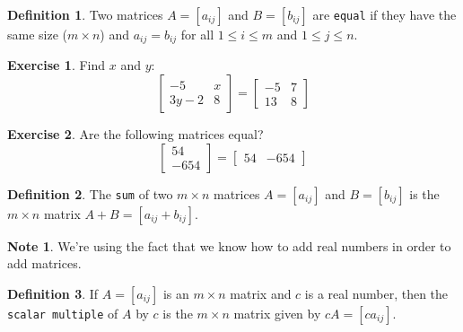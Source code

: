 \documentclass[handout]{beamer}
\newcommand{\fn}{\insertframenumber}
\theoremstyle{definition}
\newtheorem{exercise}{Exercise}
\newtheorem*{defn}{Definition}
\newtheorem*{nb}{Note}
\renewcommand{\emph}[1]{{\color{blue}\texttt{#1}}}
\begin{document}
\begin{frame}{\fn}
	\begin{defn}
		Two matrices $A=[a_{ij}]$ and $B=[b_{ij}]$ are \emph{equal} if they have the same size ($m\times n$) and $a_{ij}=b_{ij}$ for all $1\leq i\leq m$ and $1\leq j\leq n$.
	\end{defn}	
	\begin{exercise}
		Find $x$ and $y$:
			\[\begin{bmatrix}
				-5 & x\\3y-2 & 8
			\end{bmatrix}=
			\begin{bmatrix}
			-5 & 7\\13 & 8
			\end{bmatrix}
			\]
	\end{exercise}
	\begin{exercise}
		Are the following matrices equal?
		\[\begin{bmatrix}
		54 \\ -654
		\end{bmatrix}=
		\begin{bmatrix}
		54 & -654
		\end{bmatrix}
		\]
	\end{exercise}
\end{frame}

\begin{frame}{\fn}
	\begin{defn}
		The \emph{sum} of two $m\times n$ matrices $A=[a_{ij}]$ and $B=[b_{ij}]$ is the $m\times n$ matrix $A+B=[a_{ij}+b_{ij}]$. 
	\end{defn}
	\begin{nb}
		We're using the fact that we know how to add real numbers in order to add matrices.
	\end{nb}
	\begin{defn}
		If $A=[a_{ij}]$ is an $m\times n$ matrix and $c$ is a real number, then the \emph{scalar multiple} of $A$ by $c$ is the $m\times n$ matrix given by $cA=[ca_{ij}]$.
	\end{defn}
\end{frame}
\end{document}
